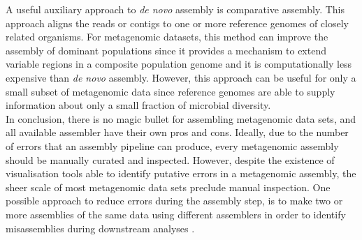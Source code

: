 A useful auxiliary approach to \textit{de novo} assembly is comparative assembly. This approach aligns the reads or contigs to one or more reference genomes of closely related organisms. For metagenomic datasets, this method can improve the assembly of dominant populations since it provides a mechanism to extend variable regions in a composite population genome and it is computationally less expensive than \textit{de novo} assembly. However, this approach can be useful for only a small subset of metagenomic data since reference genomes are able to supply information about only a small fraction of microbial diversity.\\
In conclusion, there is no magic bullet for assembling metagenomic data sets, and all available assembler have their own pros and cons. Ideally, due to the number of errors that an assembly pipeline can produce, every metagenomic assembly should be manually curated and inspected. However, despite the existence of visualisation tools able to identify putative errors in a metagenomic assembly, the sheer scale of most metagenomic data sets preclude manual inspection. One possible approach to reduce errors during the assembly step, is to make two or more assemblies of the same data using different assemblers in order to identify misassemblies during downstream analyses \cite{martin2006metagenomic}.\\%

